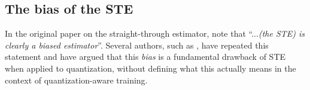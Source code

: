 


\subsection{The bias of the STE}
\label{app:biased_ste}
In the original paper on the straight-through estimator, \citet{bengio2013estimating} note that ``...\textit{(the STE) is clearly a biased estimator}''. Several authors, such as \citet{chmiel2022luq, fan2021extreme}, have repeated this statement and have argued that this \textit{bias} is a fundamental drawback of STE when applied to quantization, without defining what this actually means in the context of quantization-aware training.


